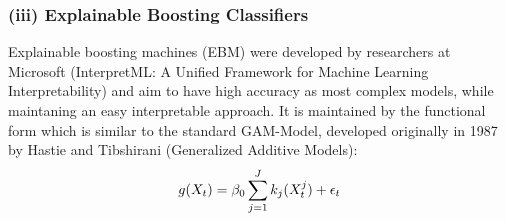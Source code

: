 \documentclass[12pt,titlepage]{article}
\begin{document}
\subsubsection*{(iii) Explainable Boosting Classifiers}

Explainable boosting machines (EBM) were developed by researchers at Microsoft (InterpretML: A Unified Framework for Machine Learning Interpretability) and aim to have high accuracy as most complex models, while maintaning an easy interpretable approach. It is maintained by the functional form which is similar to the standard GAM-Model, developed originally in 1987 by Hastie and Tibshirani (Generalized Additive Models): \\

\begin{equation} \label{gam}
    g(X_{t}) = \beta_{0} \sum_{j=1}^{J} k_{j}(X^{j}_{t}) + \epsilon_{t} \\
\end{equation}
\end{document}
